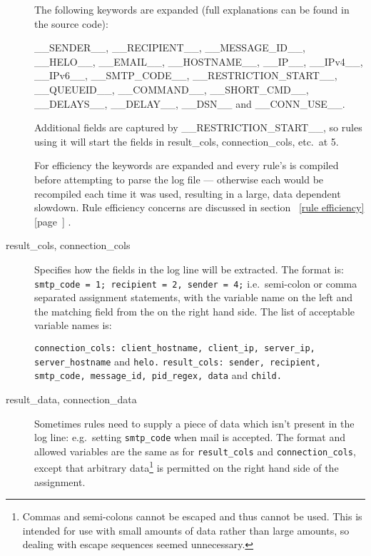 \documentclass[a4paper,12pt,draft]{article}
\newcommand{\refwithpage}[1]{%
    \empty{}\ref{#1} [page~\pageref{#1}]%
}
\newcommand{\tab}[0]{%
    \hspace*{2em}%
}
\begin{document}
\begin{description}
        The following keywords are expanded (full explanations can be found
        in the source code):

        \_\_SENDER\_\_, \_\_RECIPIENT\_\_, \_\_MESSAGE\_ID\_\_,
        \_\_HELO\_\_, \newline \_\_EMAIL\_\_, \_\_HOSTNAME\_\_, \_\_IP\_\_,
        \_\_IPv4\_\_, \_\_IPv6\_\_, \newline \_\_SMTP\_CODE\_\_,
        \_\_RESTRICTION\_START\_\_, \_\_QUEUEID\_\_, \newline
        \_\_COMMAND\_\_, \_\_SHORT\_CMD\_\_, \_\_DELAYS\_\_, \_\_DELAY\_\_,
        \_\_DSN\_\_ and \_\_CONN\_USE\_\_.

        Additional fields are captured by \_\_RESTRICTION\_START\_\_, so
        rules using it will start the fields in result\_cols,
        connection\_cols, etc.\ at 5.

        For efficiency the keywords are expanded and every rule's \regex{}
        is compiled before attempting to parse the log file --- otherwise
        each \regex{} would be recompiled each time it was used, resulting
        in a large, data dependent slowdown.  Rule efficiency concerns are
        discussed in section~\refwithpage{rule efficiency}.

    \item [result\_cols, connection\_cols] Specifies how the fields in the
        log line will be extracted.  The format is: \newline
        \texttt{smtp\_code = 1; recipient = 2, sender = 4;} \newline i.e.\
        semi-colon or comma separated assignment statements, with the
        variable name on the left and the matching field from the \regex{}
        on the right hand side.  The list of acceptable variable names is:

        \texttt{connection\_cols: client\_hostname, client\_ip, server\_ip,
        \newline \tab{} server\_hostname} and \texttt{helo.\newline}
        \texttt{result\_cols: sender, recipient, smtp\_code, message\_id,
        \newline \tab{} pid\_regex, data} and \texttt{child.}

    \item [result\_data, connection\_data] Sometimes rules need to supply a
        piece of data which isn't present in the log line: e.g.\ setting
        \texttt{smtp\_code} when mail is accepted.  The format and allowed
        variables are the same as for \texttt{result\_cols} and
        \texttt{connection\_cols}, except that arbitrary
        data\footnote{Commas and semi-colons cannot be escaped and thus
        cannot be used.  This is intended for use with small amounts of
        data rather than large amounts, so dealing with escape sequences
        seemed unnecessary.} is permitted on the right hand side of the
        assignment.


\end{description}
\end{document}
